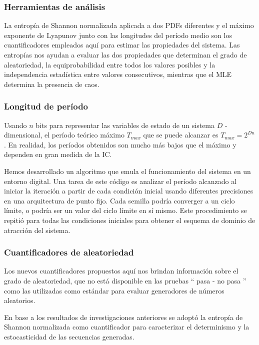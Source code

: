 \subsubsection{Herramientas de análisis}
\label{sec:quanti}

La entropía de Shannon normalizada aplicada a dos PDFs diferentes y el máximo exponente de Lyapunov junto con las longitudes del período medio son los cuantificadores empleados aquí para estimar las propiedades del sistema.
Las entropías nos ayudan a evaluar las dos propiedades que determinan el grado de aleatoriedad, la equiprobabilidad entre todos los valores posibles y la independencia estadística entre valores consecutivos, mientras que el MLE determina la presencia de caos.
 
\subsubsection{Longitud de período}

Usando $n$ bits para representar las variables de estado de un sistema $D$ -dimensional, el período teórico máximo $T_{max}$ que se puede alcanzar es $T_{max} = 2 ^ {Dn}$.
En realidad, los períodos obtenidos son mucho más bajos que el máximo y dependen en gran medida de la IC.

Hemos desarrollado un algoritmo que emula el funcionamiento del sistema en un entorno digital.
Una tarea de este código es analizar el período alcanzado al iniciar la iteración a partir de cada condición inicial usando diferentes precisiones en una arquitectura de punto fijo.
Cada semilla podría converger a un ciclo límite, o podría ser un valor del ciclo límite en sí mismo.
Este procedimiento se repitió para todas las condiciones iniciales para obtener el esquema de dominio de atracción del sistema.

\subsubsection{Cuantificadores de aleatoriedad}
\label{cu_ran}

Los nuevos cuantificadores propuestos aquí nos brindan información sobre el grado de aleatoriedad, que no está disponible en las pruebas `` pasa - no pasa '' como las utilizadas como estándar para evaluar generadores de números aleatorios.

En base a los resultados de investigaciones anteriores \cite{DeMicco2008, Antonelli2016, DeMicco2011} se adoptó la entropía de Shannon normalizada como cuantificador para caracterizar el determinismo y la estocasticidad de las secuencias generadas.

